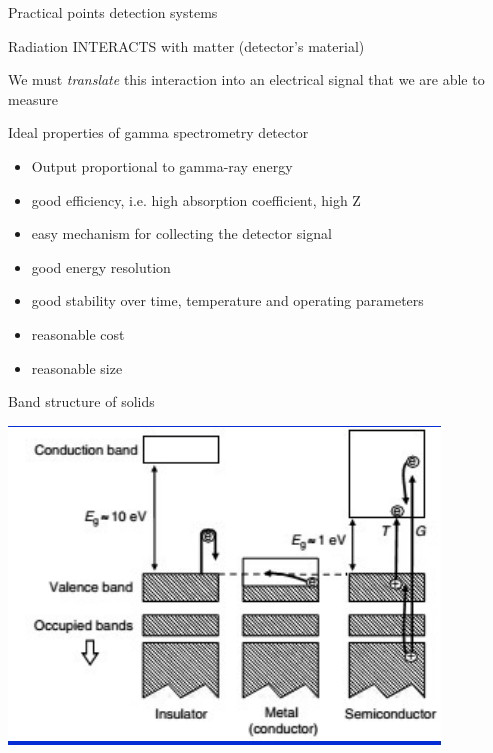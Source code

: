 \begin{frame}{Practical points detection systems}

\begin{block}{}
Radiation INTERACTS with matter (detector's material)
\end{block}

\pause
\centering \arrowdown

\pause
\begin{block}{}
We must \emph{translate} this interaction into an electrical signal that we are able to measure
\end{block}

\end{frame}



\begin{frame}{Ideal properties of gamma spectrometry detector}

\begin{exampleblock}{}
{\small
\begin{itemize}
\item Output proportional to gamma-ray energy 
\item good efficiency, i.e. high absorption coefficient, high Z 
\item easy mechanism for collecting the detector signal 
\item good energy resolution 
\item good stability over time, temperature and operating parameters 
\item reasonable cost
\item reasonable size
\end{itemize}
}
\end{exampleblock}

\end{frame}

\begin{frame}{Band structure of solids}

\centering
\includegraphics[scale=0.6]{figures/bands.png}

\end{frame}

